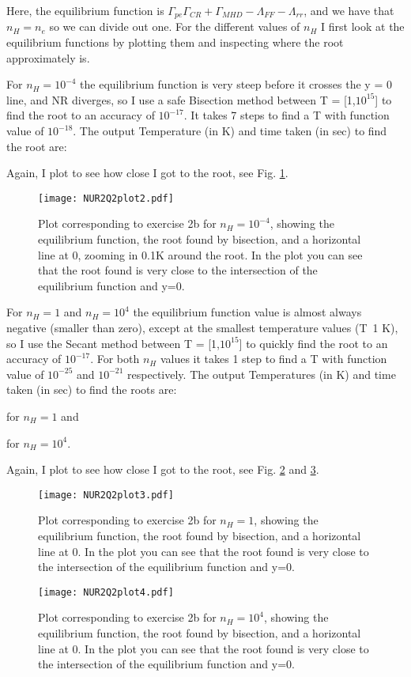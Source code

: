 Here, the equilibrium function is $\Gamma_{pe} \Gamma_{CR} + \Gamma_{MHD} - \Lambda_{FF} - \Lambda_{rr}$, and we have that $n_H = n_e$ so we can divide out one. 
For the different values of $n_H$ I first look at the equilibrium functions by plotting them and inspecting where the root approximately is. 

For $n_H = 10^{-4}$ the equilibrium function is very steep before it crosses the y = 0 line, and NR diverges, so I use a safe Bisection method between T = [1,$10^{15}$] to find the root to an accuracy of $10^{-17}$. It takes 7 steps to find a T with function value of $10^{-18}$.
The output Temperature (in K) and time taken (in sec) to find the root are:


Again, I plot to see how close I got to the root, see Fig. \ref{fig:fig2}.

\begin{figure}[h!]
  \centering
  \texttt{[image: NUR2Q2plot2.pdf]}
  \caption{Plot corresponding to exercise 2b for $n_H = 10^{-4}$, showing the equilibrium function, the root found by bisection, and a horizontal line at 0, zooming in 0.1K around the root. In the plot you can see that the root found is very close to the intersection of the equilibrium function and y=0.}
  \label{fig:fig2}
\end{figure} 


For $n_H = 1$ and $n_H = 10^4$ the equilibrium function value is almost always negative (smaller than zero), except at the smallest temperature values (T~1 K), so I use the Secant method between T = [1,$10^{15}$] to quickly find the root to an accuracy of $10^{-17}$. 
For both $n_H$ values it takes 1 step to find a T with function value of $10^{-25}$ and $10^{-21}$ respectively.
The output Temperatures (in K) and time taken (in sec) to find the roots are:

for $n_H = 1$ and 

for $n_H = 10^4$.

Again, I plot to see how close I got to the root, see Fig. \ref{fig:fig3} and \ref{fig:fig4}.


\begin{figure}[h!]
  \centering
  \texttt{[image: NUR2Q2plot3.pdf]}
  \caption{Plot corresponding to exercise 2b for $n_H = 1$, showing the equilibrium function, the root found by bisection, and a horizontal line at 0. In the plot you can see that the root found is very close to the intersection of the equilibrium function and y=0.}
  \label{fig:fig3}
\end{figure} 

\begin{figure}[h!]
  \centering
  \texttt{[image: NUR2Q2plot4.pdf]}
  \caption{Plot corresponding to exercise 2b for $n_H = 10^4$, showing the equilibrium function, the root found by bisection, and a horizontal line at 0. In the plot you can see that the root found is very close to the intersection of the equilibrium function and y=0.}
  \label{fig:fig4}
\end{figure} 
